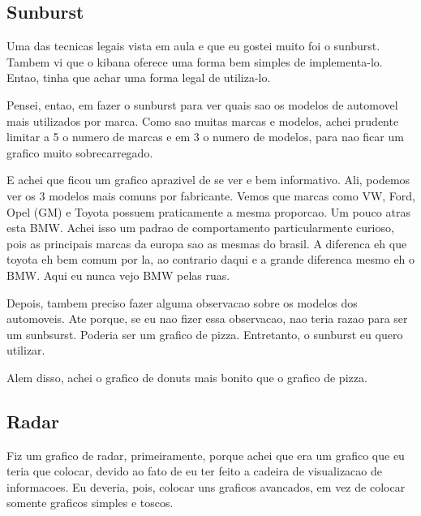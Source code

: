 \documentclass[10pt, conference]{IEEEtran}
\begin{document}


\subsection{Sunburst}

Uma das tecnicas legais vista em aula e que eu gostei muito foi o sunburst. Tambem vi que o kibana
oferece uma forma bem simples de implementa-lo. Entao, tinha que achar uma forma legal de utiliza-lo.

Pensei, entao, em fazer o sunburst para ver quais sao os modelos de automovel mais utilizados por marca.
Como sao muitas marcas e modelos, achei prudente limitar a 5 o numero de marcas e em 3 o numero de modelos,
para nao ficar um grafico muito sobrecarregado. 

E achei que ficou um grafico aprazivel de se ver e bem informativo. Ali, podemos ver os 3 modelos mais
comuns por fabricante. Vemos que marcas como VW, Ford, Opel (GM) e Toyota possuem praticamente a mesma
proporcao. Um pouco atras esta BMW. Achei isso um padrao de comportamento particularmente curioso, pois
as principais marcas da europa sao as mesmas do brasil. A diferenca eh que toyota eh bem comum por la,
ao contrario daqui e a grande diferenca mesmo eh o BMW. Aqui eu nunca vejo BMW pelas ruas.

Depois, tambem preciso fazer alguma observacao sobre os modelos dos automoveis. Ate porque, se eu nao
fizer essa observacao, nao teria razao para ser um sunbsurst. Poderia ser um grafico de pizza.
Entretanto, o sunburst eu quero utilizar.

Alem disso, achei o grafico de donuts mais bonito que o grafico de pizza.





\subsection{Radar}

Fiz um grafico de radar, primeiramente, porque achei que era um grafico que eu teria que colocar, devido
ao fato de eu ter feito a cadeira de visualizacao de informacoes. Eu deveria, pois, colocar uns graficos
avancados, em vez de colocar somente graficos simples e toscos. 
\end{document}
